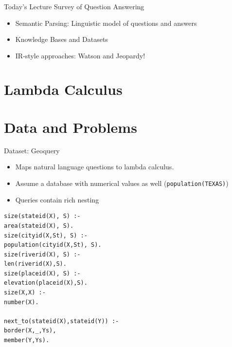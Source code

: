 \documentclass{beamer}
\begin{document}
\begin{frame}{Today's Lecture}
  Survey of Question Answering 
  \begin{itemize}
  \item Semantic Parsing: Linguistic model of questions and answers
    \air
  \item Knowledge Bases and Datasets
    \air 
    
  \item IR-style approaches: Watson and Jeopardy!
  \end{itemize}  
\end{frame}


\section{Lambda Calculus}

{

}


{

}

{

}


\section{Data and Problems}



\begin{frame}{Dataset: Geoquery}
  \begin{itemize}
  \item Maps natural language questions to lambda calculus.
    \air 
  \item Assume a database with numerical values as well (\texttt{population(TEXAS)})

    \air
  \item Queries contain rich nesting
  \end{itemize}
\end{frame}

\begin{frame}[fragile]
\begin{verbatim}
size(stateid(X), S) :-
area(stateid(X), S).
size(cityid(X,St), S) :-
population(cityid(X,St), S).
size(riverid(X), S) :-
len(riverid(X),S).
size(placeid(X), S) :-
elevation(placeid(X),S).
size(X,X) :-
number(X).

next_to(stateid(X),stateid(Y)) :-
border(X,_,Ys),
member(Y,Ys).
\end{verbatim}

\end{frame}
\end{document}

